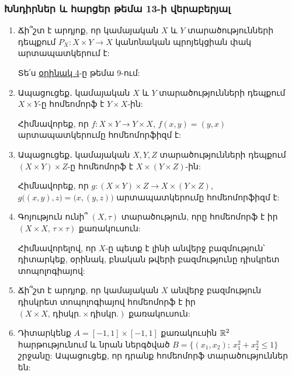 \bigskip
\bigskip
\subsubsection*{Խնդիրներ և հարցեր թեմա 13-ի վերաբերյալ}

\begin{enumerate}[label=\thesection.\arabic*.]

\item Ճի՞շտ է արդյոք, որ կամայական $X$ և $Y$ տարածությունների դեպքում \linebreak $P_X: X \times Y \to X$ կանոնական պրոյեկցիան փակ արտապատկերում է:

\begin{hint}
Տե՛ս \hyperref[ch9ex4]{օրինակ 4}-ը թեմա 9-ում:
\end{hint}

\item Ապացուցեք․ կամայական $X$ և $Y$ տարածությունների դեպքում $X \times Y$-ը հո\-մե\-ո\-մորֆ է $Y \times X$-ին:

\begin{hint}
Հիմնավորեք, որ $f: X \times Y \to Y \times X$, $f(x,y)=(y,x)$ արտա\-պատ\-կերումը հոմեոմորֆիզմ է:
\end{hint}

\item Ապացուցեք․ կամայական $X, Y, Z$ տարածությունների դեպքում $(X \times Y) \times Z$-ը հոմեոմորֆ է $X \times (Y \times Z)$-ին:

\begin{hint}
Հիմնավորեք, որ $g: (X \times Y) \times Z \to X \times (Y \times Z)$, $g\big((x,y),z\big)=\big(x,(y,z)\big)$ արտապատկերումը հոմեոմորֆիզմ է:
\end{hint}

\item Գոյություն ունի՞ $(X, \tau)$ տարածություն, որը հոմեոմորֆ է իր $(X \times X,\, \tau \times \tau)$ քառակուսուն:

\begin{hint}
Հիմնավորելով, որ $X$-ը պետք է լինի անվերջ բազմություն՝ դիտ\-ար\-կեք, օրինակ, բնական թվերի բազմությունը դիսկրետ տոպոլոգիայով:
\end{hint}

\item Ճի՞շտ է արդյոք, որ կամայական $X$ անվերջ բազմություն դիսկրետ տոպոլո\-գի\-ա\-յով հոմեոմորֆ է իր $(X \times X,\, \text{դիսկր.} \times \text{դիսկր.})$ քառակուսուն:

\item Դիտարկենք $A=[-1,1] \times [-1,1]$ քառակուսին $\mathbb{R}^2$ հարթությունում և նրան ներգծված $B=\{(x_1, x_2);\ x_1^2+x_2^2 \le 1\}$ շրջանը: Ապացուցեք, որ դրանք հոմեո\-մորֆ տարածություններ են:


\end{enumerate}
